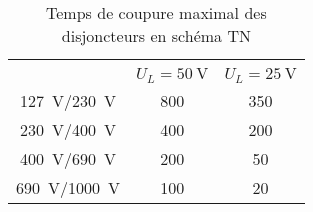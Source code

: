 

\begin{comment}

\documentclass[a4paper, 11pt, twoside, fleqn]{memoir}

\usepackage{AOCDTF}

\marqueurchapitre
\decoupagechapitre{1} %




	\openleft %

\end{comment}

\begin{table}[H]
\caption{Temps de coupure maximal des disjoncteurs en schéma TN\label{tab:schema_tn_temps_coupure}}
\begin{tabularx}{\textwidth}{C C C}
\toprule
{} & \\
\cmidrule(lr){2-3} 
	& $U_{L}=\SI{50}{\volt}$ 	& 			$U_{L}=\SI{25}{\volt}$  \\
\midrule
\SI{127}{\volt}/\SI{230}{\volt}		& 800		& 350 \\
\SI{230}{\volt}/\SI{400}{\volt}		& 400		& 200 \\
\SI{400}{\volt}/\SI{690}{\volt}		& 200		& 50 \\
\SI{690}{\volt}/\SI{1000}{\volt}	& 100		& 20 \\
\bottomrule 
\end{tabularx}
\end{table}

%

